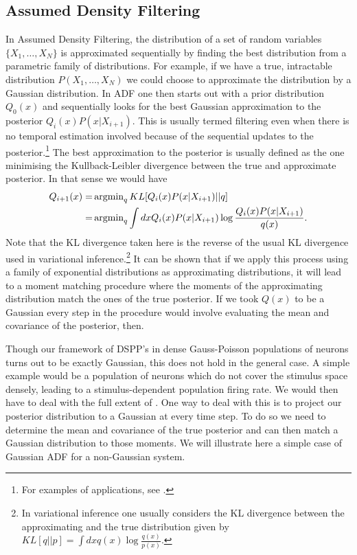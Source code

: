 \subsection{Assumed Density Filtering}

In Assumed Density Filtering, the distribution of a set of random variables $\{X_1,\ldots, X_N\}$ is approximated
sequentially by finding the best distribution from a parametric family of distributions. For example, if we have a true, intractable distribution $P(X_1,\ldots,X_N)$ we
could choose to approximate the distribution by a Gaussian distribution. In ADF one then starts out with a prior distribution $Q_0(x)$ and sequentially looks
for the best Gaussian approximation to the posterior $Q_i(x) P(x|X_{i+1})$. This is usually termed filtering even when there is no temporal estimation
involved because of the sequential updates to the posterior.\footnote{For examples of applications, see \citep{opper2000,boyen1998,minka2001}.} The best
approximation to the posterior is usually defined as the one minimising the Kullback-Leibler divergence between the true and approximate posterior. In that sense
we would have 
\begin{align*}
Q_{i+1} (x) =& \operatorname{argmin}_q KL[Q_i(x) P(x|X_{i+1})||q] \\=& \operatorname{argmin}_q \int dx Q_i(x) P(x|X_{i+1}) \log \frac{Q_i(x) P(x|X_{i+1})}{q(x)}.
\end{align*}
Note that the KL divergence taken here is the reverse of the usual KL divergence used in variational inference.\footnote{In variational inference one usually considers
the KL divergence between the approximating and the true distribution given by $KL[q||p] = \int dx q(x) \log\frac{q(x)}{p(x)}$.} It can be shown that if we apply this 
process using a family of exponential distributions as approximating distributions, it will lead
to a moment matching procedure where the moments of the approximating distribution match the ones of the true posterior. If we took $Q(x)$ to be a Gaussian
every step in the procedure would involve evaluating the mean and covariance of the posterior, then.
\par

Though our framework of DSPP's in dense Gauss-Poisson populations of neurons turns out to be exactly Gaussian, this does not hold in the general case.
A simple example would be a population of neurons which do not cover the stimulus space densely, leading to a stimulus-dependent population firing rate. We would
then have to deal with the full extent of . One way to deal with this is to project our posterior distribution to a Gaussian at every time step. To do
so we need to determine the mean and covariance of the true posterior and can then match a Gaussian distribution to those moments. We will illustrate here a simple
case of Gaussian ADF for a non-Gaussian system.\par

